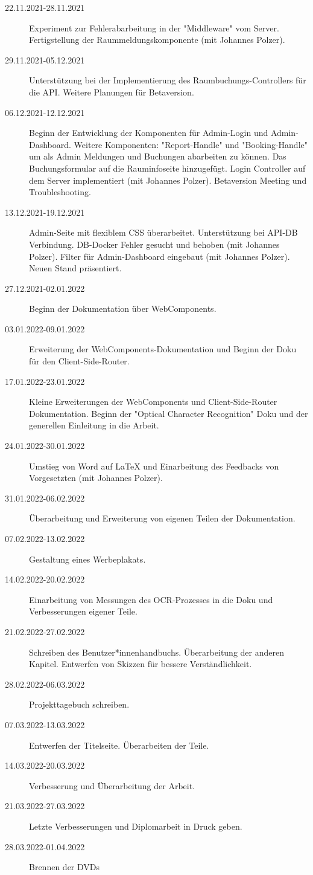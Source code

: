 \begin{description}
    \item[22.11.2021-28.11.2021] Experiment zur Fehlerabarbeitung in der "Middleware" vom Server. Fertigstellung der Raummeldungskomponente (mit Johannes Polzer).
    \item[29.11.2021-05.12.2021] Unterstützung bei der Implementierung des Raumbuchungs-Controllers für die API. Weitere Planungen für Betaversion.
    \item[06.12.2021-12.12.2021] Beginn der Entwicklung der Komponenten für Admin-Login und Admin-Dashboard. Weitere Komponenten: "Report-Handle" und "Booking-Handle" um als Admin Meldungen und Buchungen abarbeiten zu können. Das Buchungsformular auf die Rauminfoseite hinzugefügt. Login Controller auf dem Server implementiert (mit Johannes Polzer). Betaversion Meeting und Troubleshooting.
    \item[13.12.2021-19.12.2021] Admin-Seite mit flexiblem CSS überarbeitet. Unterstützung bei API-DB Verbindung. DB-Docker Fehler gesucht und behoben (mit Johannes Polzer). Filter für Admin-Dashboard eingebaut (mit Johannes Polzer). Neuen Stand präsentiert.
    \item[27.12.2021-02.01.2022] Beginn der Dokumentation über WebComponents.
    \item[03.01.2022-09.01.2022] Erweiterung der WebComponents-Dokumentation und Beginn der Doku für den Client-Side-Router.
    \item[17.01.2022-23.01.2022] Kleine Erweiterungen der WebComponents und Client-Side-Router Dokumentation. Beginn der "Optical Character Recognition" Doku und der generellen Einleitung in die Arbeit. 
    \item[24.01.2022-30.01.2022] Umstieg von Word auf LaTeX und Einarbeitung des Feedbacks von Vorgesetzten (mit Johannes Polzer). 
    \item[31.01.2022-06.02.2022] Überarbeitung und Erweiterung von eigenen Teilen der Dokumentation. 
    \item[07.02.2022-13.02.2022] Gestaltung eines Werbeplakats.
    \item[14.02.2022-20.02.2022] Einarbeitung von Messungen des OCR-Prozesses in die Doku und Verbesserungen eigener Teile.
    \item[21.02.2022-27.02.2022] Schreiben des Benutzer*innenhandbuchs. Überarbeitung der anderen Kapitel. Entwerfen von Skizzen für bessere Verständlichkeit.
    \item[28.02.2022-06.03.2022] Projekttagebuch schreiben. 
    \item[07.03.2022-13.03.2022] Entwerfen der Titelseite. Überarbeiten der Teile.
    \item[14.03.2022-20.03.2022] Verbesserung und Überarbeitung der Arbeit.
    \item[21.03.2022-27.03.2022] Letzte Verbesserungen und Diplomarbeit in Druck geben.
    \item[28.03.2022-01.04.2022] Brennen der DVDs
\end{description}